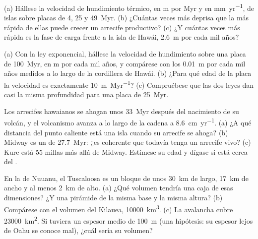 \begin{exercise}[$\star\star$]\label{exo:b2:oceanic-islands:5}
(a) Hállese la velocidad de hundimiento térmico, en \unit{m} por \unit{Myr} y en \unit{mm.yr^{-1}}, de
islas sobre placas de 4, 25 y \qty{49}{Myr}. (b) ¿Cuántas veces más deprisa que la más rápida de ellas
puede crecer un arrecife productivo? (c) ¿Y cuántas veces más rápida es la fase de carga frente a la isla de
Hawái, \qty{2.6}{m} por cada mil años?
\end{exercise}

\begin{exercise}[$\star\star$]\label{exo:b2:oceanic-islands:6}
(a) Con la ley exponencial, hállese la velocidad de hundimiento sobre una placa de \qty{100}{Myr}, en \unit{m}
por cada mil años, y compárese con los \qty{0.01}{m} por cada mil años medidos a lo largo de la
cordillera de Hawái. (b) ¿Para qué edad de la placa la velocidad es exactamente \qty{10}{m.Myr^{-1}}? (c) Compruébese que las
dos leyes dan casi la misma profundidad para una placa de \qty{25}{Myr}.
\end{exercise}

\begin{exercise}[$\star\star$]\label{exo:b2:oceanic-islands:7}
Los arrecifes hawaianos se ahogan unos \qty{33}{Myr} después del nacimiento de su volcán, y el volcanismo avanza
a lo largo de la cadena a \qty{8.6}{cm.yr^{-1}}. (a) ¿A qué distancia del punto caliente está una isla cuando su
arrecife se ahoga? (b) Midway es un  de \qty{27.7}{Myr}: ¿es coherente que todavía tenga un
arrecife vivo? (c) Kure está 55 millas más allá de Midway. Estímese su edad y dígase si está cerca
del .
\end{exercise}

\begin{exercise}[$\star\star$]\label{exo:b2:oceanic-islands:8}
En la  de Nuuanu, el  Tuscaloosa es un bloque de unos \qty{30}{km} de largo,
\qty{17}{km} de ancho y al menos \qty{2}{km} de alto. (a) ¿Qué volumen tendría una caja de esas dimensiones?
¿Y una pirámide de la misma base y la misma altura? (b) Compárese con el volumen del
Kilauea, \qty{10000}{km^3}. (c) La avalancha cubre \qty{23000}{km^2}. Si tuviera un espesor medio de
\qty{100}{m} (una hipótesis: su espesor lejos de Oahu se conoce mal), ¿cuál sería su
volumen?
\end{exercise}

